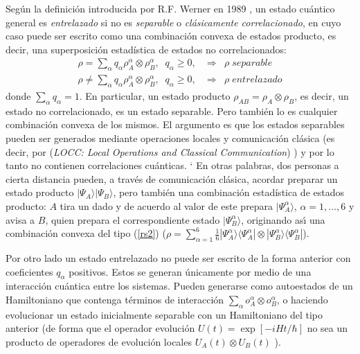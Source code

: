 
Según la definición introducida por R.F. Werner en 1989 \cite{W.89}, un estado
cuántico general es {\it entrelazado} si no es {\it separable} o {\it clásicamente correlacionado}, 
en cuyo caso puede ser escrito como una combinación convexa de estados producto, es decir,
una superposición estadística de estados no correlacionados:
\begin{eqnarray}\rho=\sum_{\alpha} q_\alpha \rho_A^\alpha\otimes\rho_B^\alpha,
\;\;q_\alpha\geq 0,\;&\Rightarrow & \rho\;separable\label{rs2}\\
\rho\neq \sum_{\alpha} q_\alpha \rho_A^\alpha\otimes\rho_B^\alpha,
 \;\;q_\alpha\geq 0,&\Rightarrow& \rho\;entrelazado\end{eqnarray}
donde $\sum_\alpha q_\alpha=1$. En particular, un estado producto
$\rho_{AB}=\rho_A\otimes\rho_B$, es decir, un estado no correlacionado, es un
estado separable. Pero también lo es cualquier combinación convexa de los
mismos. El argumento \cite{W.89} es que los estados separables pueden ser
generados mediante operaciones locales y comunicación clásica (es decir, por
({\it LOCC: Local Operations and Classical Communication}) \cite{NC.00}) y por lo tanto no
contienen correlaciones cuánticas.
`
En otras palabras, dos personas a cierta distancia pueden, a través de comunicación clásica, acordar
preparar un estado producto $|\Psi_A\rangle|\Psi_B\rangle$, pero también una combinación
estadística de estados producto: $A$ tira un dado y de acuerdo al valor de este
prepara $|\Psi^\alpha_A\rangle$, $\alpha=1,\ldots,6$ y avisa a $B$, quien
prepara el correspondiente estado $|\Psi^\alpha_B\rangle$, originando as\'{\i}
una combinación convexa del tipo (\ref{rs2})
($\rho=\sum_{\alpha=1}^6\frac{1}{6}|\Psi_A^\alpha\rangle\langle\Psi_A^\alpha|\otimes|\Psi_B^\alpha\rangle
\langle\Psi_B^\alpha|$).

Por otro lado un estado entrelazado no puede ser
escrito de la forma anterior con coeficientes $q_\alpha$ positivos. Estos se generan únicamente por medio de una 
interacción cuántica entre los sistemas. Pueden generarse como autoestados de un Hamiltoniano que contenga t\'erminos de interacción $\sum_\alpha o^\alpha_{A}\otimes o^\alpha_B$, o haciendo evolucionar 
un estado inicialmente separable con un Hamiltoniano del tipo anterior \cite{NC.00,RS.07} (de forma que el operador evolución 
$U(t)=\exp[-iH t/\hbar]$ no sea un producto de operadores de evolución
locales $U_A(t)\otimes U_B(t)$ ).

